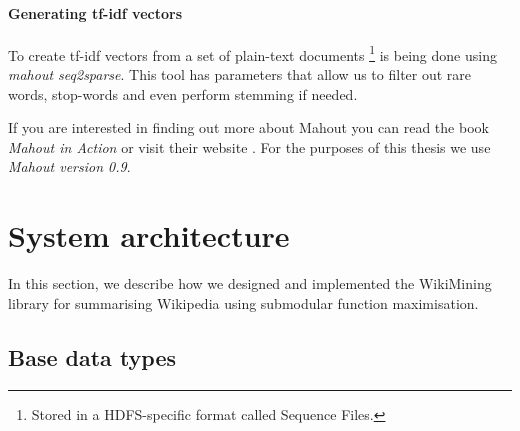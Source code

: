 
\paragraph{Generating tf-idf vectors} To create tf-idf vectors from a set of
plain-text documents \footnote{Stored in a \ac{HDFS}-specific format called
Sequence Files.} is being done using \emph{mahout seq2sparse}. This tool has
parameters that allow us to filter out rare words, stop-words and even perform
stemming if needed.

If you are interested in finding out more about Mahout you can read the book
\emph{Mahout in Action}  or visit their website
. For the purposes of this thesis we use
\emph{Mahout version 0.9}.

\section{System architecture}

In this section, we describe how we designed and implemented the WikiMining
library for summarising Wikipedia using submodular function maximisation.

\subsection{Base data types}

